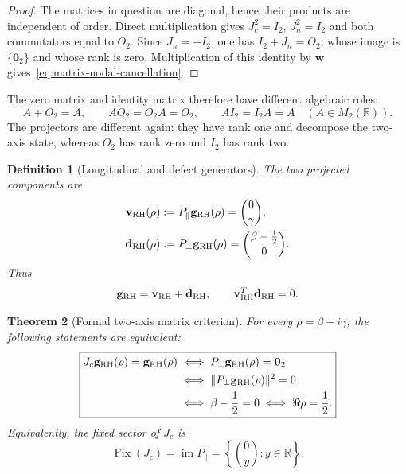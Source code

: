 \documentclass[11pt]{article}
\newtheorem{definition}{Definition}[section]
\newtheorem{theorem}[definition]{Theorem}
\newcommand{\vzero}{\mathbf 0}
\begin{document}
\begin{proof}
The matrices in question are diagonal, hence their products are independent of order.
Direct multiplication gives $J_c^2=I_2$, $J_n^2=I_2$ and both commutators equal to
$O_2$.  Since $J_n=-I_2$, one has $I_2+J_n=O_2$, whose image is
$\{\vzero_2\}$ and whose rank is zero.  Multiplication of this identity by $\mathbf w$
gives~\eqref{eq:matrix-nodal-cancellation}.
\end{proof}

The zero matrix and identity matrix therefore have different algebraic roles:
\begin{equation}\label{eq:null-identity-action}
 A+O_2=A,\qquad AO_2=O_2A=O_2,\qquad
 AI_2=I_2A=A
 \quad(A\in M_2(\mathbb R)).
\end{equation}
The projectors are different again: they have rank one and decompose the two-axis state,
whereas $O_2$ has rank zero and $I_2$ has rank two.

\begin{definition}[Longitudinal and defect generators]\label{def:components}
The two projected components are
\begin{align}
 \mathbf v_{\rm RH}(\rho)
  &:=P_{\parallel}\mathbf g_{\rm RH}(\rho)=\binom0\gamma,
  \label{eq:longitudinal}\\
 \mathbf d_{\rm RH}(\rho)
  &:=P_{\perp}\mathbf g_{\rm RH}(\rho)
    =\binom{\beta-\tfrac12}{0}.
  \label{eq:defect}
\end{align}
Thus
\begin{equation}\label{eq:orthogonal-decomposition}
 \mathbf g_{\rm RH}=\mathbf v_{\rm RH}+\mathbf d_{\rm RH},\qquad
 \mathbf v_{\rm RH}^{T}\mathbf d_{\rm RH}=0.
\end{equation}
\end{definition}

\begin{theorem}[Formal two-axis matrix criterion]
\label{thm:formal-matrix-criterion}
For every $\rho=\beta+i\gamma$, the following statements are equivalent:
\begin{equation}\label{eq:formal-matrix-chain}
 \boxed{\begin{aligned}
 J_c\mathbf g_{\rm RH}(\rho)=\mathbf g_{\rm RH}(\rho)
 &\iff P_{\perp}\mathbf g_{\rm RH}(\rho)=\vzero_2\\
 &\iff \|P_{\perp}\mathbf g_{\rm RH}(\rho)\|^2=0\\
 &\iff \beta-\frac12=0
 \iff \Re\rho=\frac12.
 \end{aligned}}
\end{equation}
Equivalently, the fixed sector of $J_c$ is
\begin{equation}\label{eq:fixed-sector}
 \operatorname{Fix}(J_c)=\operatorname{im}P_{\parallel}
 =\left\{\binom0y:y\in\mathbb R\right\}.
\end{equation}
\end{theorem}
\end{document}
